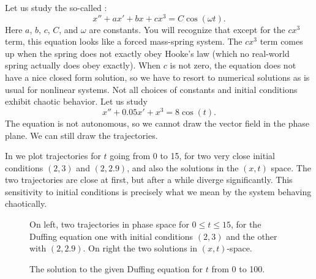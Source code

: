 \documentclass[12pt]{book}
\begin{document}
Let us study the so-called \emph{}:
\begin{equation*}
x'' + a x' + bx + cx^3 = C \cos(\omega t) .
\end{equation*}
Here $a$, $b$, $c$, $C$, and $\omega$ are constants.
You will recognize that except for the $c x^3$ term, this equation looks like
a forced mass-spring system.  The $c x^3$ term comes up when the spring does
not exactly obey Hooke's law (which no real-world spring actually does obey
exactly).  When $c$ is not zero, the equation does not have a nice closed
form solution, so we have to resort to numerical solutions as is usual for
nonlinear systems.  Not all choices of constants and initial conditions
exhibit chaotic behavior.  Let us study
\begin{equation*}
x''+0.05 x' + x^3 = 8\cos(t) .
\end{equation*}
The equation is not autonomous, so we cannot 
draw the vector field in the phase plane.
We can still draw the
trajectories.   

In  we plot trajectories for $t$ going from 0
to 15, for two very close initial conditions
$(2,3)$ and $(2,2.9)$, and also the solutions in the $(x,t)$ space.  The two
trajectories are close at first, but after a while diverge significantly.
This sensitivity to initial conditions is precisely what
we mean by the system behaving chaotically.

\begin{figure}[h!t]
\capstart
\begin{center}
\caption{On left, two trajectories in phase space for $0 \leq t \leq 15$, for the Duffing equation
one with initial conditions $(2,3)$ and the other with $(2,2.9)$.  On
right the two solutions in $(x,t)$-space. \label{nlin:duf-two-traj}}
\end{center}
\end{figure}

\begin{figure}[h!t]
\capstart
\begin{center}
\caption{The solution to the given Duffing equation for $t$ from 0 to 100.
\label{nlin:duf-long}}
\end{center}
\end{figure}
\end{document}
